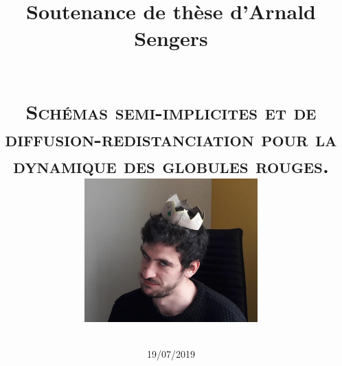 \documentclass[a4paper]{leaflet}
\begin{document}
\begin{titlepage}
  \title{
    Soutenance de thèse d'Arnald Sengers
    \date{19/07/2019} \\
    \textsc{Schémas semi-implicites et de diffusion-redistanciation pour la dynamique des globules rouges.}\\[1cm]    
    \includegraphics[width=0.5\textwidth]{crop}
} %

\end{titlepage}

\maketitle

\newpage
\end{document}
